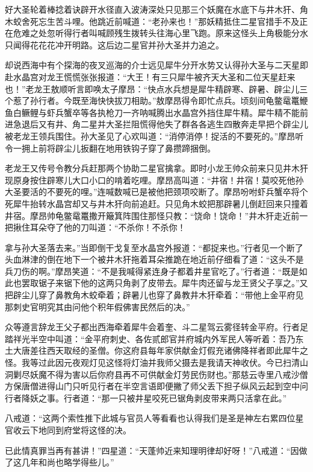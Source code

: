 \documentclass[12pt,UTF8]{ctexbook}
\begin{document}
{	好大圣轮着棒捻着诀辟开水径直入波涛深处只见那三个妖魔在水底下与井木犴、角木蛟舍死忘生苦斗哩。他跳近前喊道：“老孙来也！”那妖精抵住二星官措手不及正在危难之处忽听得行者叫喊顾残生拨转头往海心里飞跑。原来这怪头上角极能分水只闻得花花花冲开明路。这后边二星官并孙大圣并力追之。
	
	却说西海中有个探海的夜叉巡海的介士远见犀牛分开水势又认得孙大圣与二天星即赴水晶宫对龙王慌慌张张报道：“大王！有三只犀牛被齐天大圣和二位天星赶来也！”老龙王敖顺听言即唤太子摩昂：“快点水兵想是犀牛精辟寒、辟暑、辟尘儿三个惹了孙行者。今既至海快快拔刀相助。”敖摩昂得令即忙点兵。顷刻间龟鳖鼋鼍鯾鱼白鳜鲤与虾兵蟹卒等各执枪刀一齐呐喊腾出水晶宫外挡住犀牛精。犀牛精不能前进急退后又有井、角二星并大圣拦阻慌得他失了群各各逃生四散奔走早把个辟尘儿被老龙王领兵围住。孙大圣见了心欢叫道：“消停消停！捉活的不要死的。”摩昂听令一拥上前将辟尘儿扳翻在地用铁钩子穿了鼻攒蹄捆倒。
	
	老龙王又传号令教分兵赶那两个协助二星官擒拿。即时小龙王帅众前来只见井木犴现原身按住辟寒儿大口小口的啃着吃哩。摩昂高叫道：“井宿！井宿！莫咬死他孙大圣要活的不要死的哩。”连喊数喊已是被他把颈项咬断了。摩昂吩咐虾兵蟹卒将个死犀牛抬转水晶宫却又与井木犴向前追赶。只见角木蛟把那辟暑儿倒赶回来只撞着井宿。摩昂帅龟鳖鼋鼍撒开簸箕阵围住那怪只教：“饶命！饶命！”井木犴走近前一把揪住耳朵夺了他的刀叫道：“不杀你！不杀你！
	
	拿与孙大圣落去来。”当即倒干戈复至水晶宫外报道：“都捉来也。”行者见一个断了头血淋津的倒在地下一个被井木犴拖着耳朵推跪在地近前仔细看了道：“这头不是兵刀伤的啊。”摩昂笑道：“不是我喊得紧连身子都着井星官吃了。”行者道：“既是如此也罢取锯子来锯下他的这两只角剥了皮带去。犀牛肉还留与龙王贤父子享之。”又把辟尘儿穿了鼻教角木蛟牵着；辟暑儿也穿了鼻教井木犴牵着：“带他上金平府见那刺史官明究其由问他个积年假佛害民然后的决。”
	
	众等遵言辞龙王父子都出西海牵着犀牛会着奎、斗二星驾云雾径转金平府。行者足踏祥光半空中叫道：“金平府刺史、各佐贰郎官并府城内外军民人等听着：吾乃东土大唐差往西天取经的圣僧。你这府县每年家供献金灯假充诸佛降祥者即此犀牛之怪。我等过此因元夜观灯见这怪将灯油并我师父摄去是我请天神收伏。今已扫清山洞剿尽妖魔不得为害以后你府县再不可供献金灯劳民伤财也。”那慈云寺里八戒沙僧方保唐僧进得山门只听见行者在半空言语即便撇了师父丢下担子纵风云起到空中问行者降妖之事。行者道：“那一只被井星咬死已锯角剥皮带来两只活拿在此。”
	
	八戒道：“这两个索性推下此城与官员人等看看也认得我们是圣是神左右累四位星官收云下地同到府堂将这怪的决。
	
	已此情真罪当再有甚讲！”四星道：“天蓬帅近来知理明律却好呀！”八戒道：“因做了这几年和尚也略学得些儿。”
	
}
\end{document}
